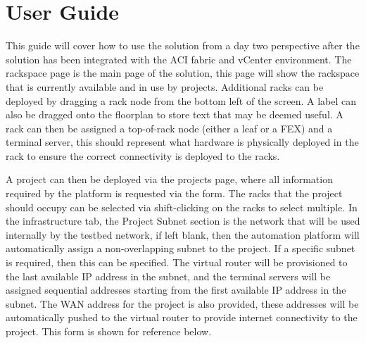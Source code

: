 \chapter{User Guide}
\label{chap:appendix-e}
This guide will cover how to use the solution from a day two perspective after the solution has been integrated with the ACI fabric and vCenter environment.
The rackspace page is the main page of the solution, this page will show the rackspace that is currently available and in use by projects. Additional racks can be deployed by dragging a rack node from the bottom left of the screen. A label can also be dragged onto the floorplan to store text that may be deemed useful. A rack can then be assigned a top-of-rack node (either a leaf or a FEX) and a terminal server, this should represent what hardware is physically deployed in the rack to ensure the correct connectivity is deployed to the racks.

A project can then be deployed via the projects page, where all information required by the platform is requested via the form. The racks that the project should occupy can be selected via shift-clicking on the racks to select multiple. In the infrastructure tab, the Project Subnet section is the network that will be used internally by the testbed network, if left blank, then the automation platform will automatically assign a non-overlapping subnet to the project. If a specific subnet is required, then this can be specified. The virtual router will be provisioned to the last available IP address in the subnet, and the terminal servers will be assigned sequential addresses starting from the first available IP address in the subnet. The WAN address for the project is also provided, these addresses will be automatically pushed to the virtual router to provide internet connectivity to the project. This form is shown for reference below.

